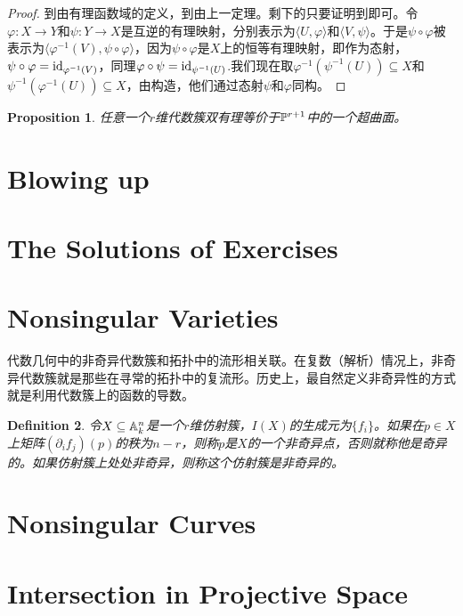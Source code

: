\documentclass[9pt]{extarticle}
\theoremstyle{plain}%
\newtheorem{defi}{Definition}[section]%
\newtheorem{pro}[defi]{Proposition}%
\begin{document}
\begin{proof}
	到由有理函数域的定义，到由上一定理。剩下的只要证明到即可。令$\varphi:X\to Y$和$\psi:Y\to X$是互逆的有理映射，分别表示为$\langle U,\varphi \rangle$和$\langle V,\psi \rangle$。于是$\psi\circ\varphi$被表示为$\langle \varphi^{-1}(V),\psi\circ\varphi \rangle$，因为$\psi\circ\varphi$是$X$上的恒等有理映射，即作为态射，$\psi\circ\varphi=\operatorname{id}_{\varphi^{-1}(V)}$，同理$\varphi\circ\psi=\operatorname{id}_{\psi^{-1}(U)}$.我们现在取$\varphi^{-1}(\psi^{-1}(U))\subseteq X$和$\psi^{-1}(\varphi^{-1}(U))\subseteq X$，由构造，他们通过态射$\psi$和$\varphi$同构。
\end{proof}
\begin{pro}
	任意一个$r$维代数簇双有理等价于$\mathbb{P}^{r+1}$中的一个超曲面。
\end{pro}
\section*{Blowing up}
\section*{The Solutions of Exercises}
\section{Nonsingular Varieties}
代数几何中的非奇异代数簇和拓扑中的流形相关联。在复数（解析）情况上，非奇异代数簇就是那些在寻常的拓扑中的复流形。历史上，最自然定义非奇异性的方式就是利用代数簇上的函数的导数。
\begin{defi}
	令$X\subseteq \mathbb{A}^n_k$是一个$r$维仿射簇，$I(X)$的生成元为$\{f_i\}$。如果在$p\in X$上矩阵$(\partial_i f_j)(p)$的秩为$n-r$，则称$p$是$X$的一个非奇异点，否则就称他是奇异的。如果仿射簇上处处非奇异，则称这个仿射簇是非奇异的。
\end{defi}
\section{Nonsingular Curves}

\section{Intersection in Projective Space}
\end{document}
